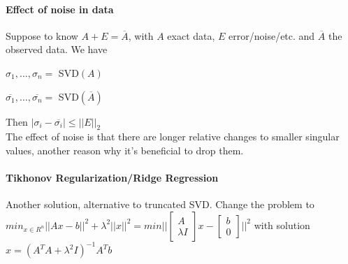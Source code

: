 \documentclass[10pt]{report}
\begin{document}
\paragraph{Effect of noise in data} Suppose to know $A+E = \overline{A}$, with $A$ exact data, $E$ error/noise/etc. and $\overline{A}$ the observed data. We have
\begin{list}{}{}
	\item $\sigma_1,\ldots,\sigma_n =$ SVD$(A)$
	\item $\overline{\sigma_1},\ldots,\overline{\sigma_n} =$ SVD$(\overline{A})$
\end{list}
Then $|\sigma_i - \overline{\sigma_i}| \leq ||E||_2$\\
The effect of noise is that there are longer relative changes to smaller singular values, another reason why it's beneficial to drop them.
\paragraph{Tikhonov Regularization/Ridge Regression} Another solution, alternative to truncated SVD. Change the problem to $min_{x\in R^n} ||Ax-b||^2 + \lambda^2||x||^2 = min||\left[\begin{array}{c}
A\\\lambda I
\end{array}\right]x - \left[\begin{array}{c}
b\\0
\end{array}\right]||^2$ with solution $x = (A^TA+\lambda^2 I)^{-1}A^Tb$
\end{document}
